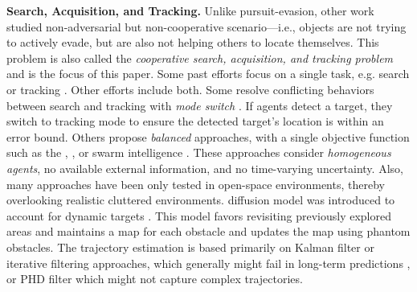 \textbf{Search, Acquisition, and Tracking.} Unlike  pursuit-evasion, other work studied non-adversarial but non-cooperative scenario---i.e., objects are not trying to actively evade, but are also not helping others to locate themselves. This problem is also called the  \emph{cooperative search, acquisition, and tracking problem} \cite{review-csat2018,taxonomy-review-2016,sat-swarm-review-2016} and is the focus of this paper.  
Some past efforts focus on a single task, e.g. search \cite{malika-search-2016} or tracking \cite{harvard-source-seek-2021}. 
%
Other efforts include both. 
Some resolve conflicting behaviors between search and tracking with \textit{mode switch} \cite{target-assign-csat-2008,increasing-autonomy-csat-2009,recursive-bayesian-csat-2006,search-track-cyprus-2021-journal,goldhoorn2018searching}. If agents detect a target, they switch to tracking mode to ensure the detected target's location is within an error bound. Others propose \textit{balanced} approaches, with a single objective function such as the , ,  or swarm intelligence .  
%
These approaches consider \emph{homogeneous agents}, no available external information, and no time-varying uncertainty. Also, many approaches have been only tested in open-space environments, thereby overlooking realistic cluttered environments.  diffusion model was introduced to account for dynamic targets \cite{increasing-autonomy-csat-2009}. This model favors revisiting previously explored areas and maintains a map for each obstacle and updates the map using phantom obstacles.  %
The trajectory estimation is based primarily on Kalman filter or iterative filtering approaches, which generally might fail in long-term predictions , or PHD filter which might not capture complex trajectories. 

